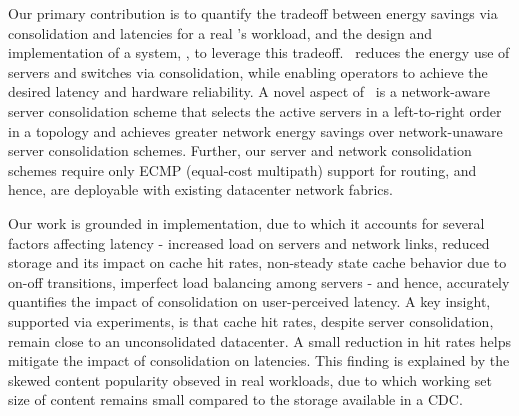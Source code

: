 Our primary contribution is to quantify the tradeoff between energy savings via consolidation and latencies for a real \cdc's workload, and the design and implementation of a system, \shrink, to leverage this tradeoff. \shrink\ reduces the energy use of servers and switches via consolidation, while enabling operators to achieve the desired latency and hardware reliability. A novel aspect of \shrink\ is a network-aware server consolidation scheme that selects the active servers in a left-to-right order in a topology and achieves greater network energy savings over network-unaware server consolidation schemes. Further, our server and network consolidation schemes require only ECMP (equal-cost multipath) support for routing, and hence, are deployable with existing datacenter network fabrics.

Our work is grounded in implementation, due to which it accounts for several factors affecting latency - increased load on servers and network links, reduced storage and its impact on cache hit rates, non-steady state cache behavior due to on-off transitions, imperfect load balancing among servers - and hence, accurately quantifies the impact of consolidation on user-perceived latency. A key insight, supported via experiments, is that cache hit rates, despite server consolidation, remain close to an unconsolidated datacenter. A small reduction in hit rates helps mitigate the impact of consolidation on latencies. This finding is explained by the skewed content popularity obseved in real workloads, due to which working set size of content remains small compared to the storage available in a CDC.







